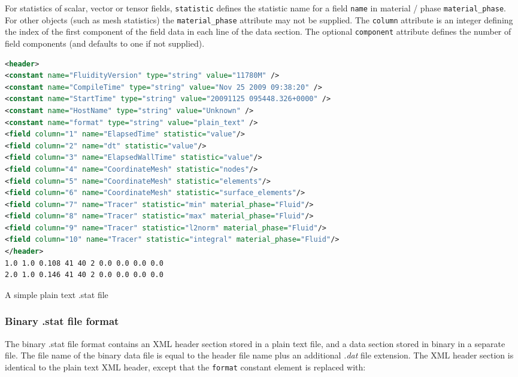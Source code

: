 For statistics of scalar, vector or tensor fields,
\lstinline[language = XML]*statistic* defines the statistic name for
a field \lstinline[language = XML]*name* in material / phase
\lstinline[language = XML]*material_phase*. For other objects (such as mesh
statistics) the \lstinline[language = XML]*material_phase* attribute may not
be supplied. The \lstinline[language = XML]*column* attribute is an integer defining the
index of the first component of the field data in each line of the data section.
The optional \lstinline[language = XML]*component* attribute defines the number
of field components (and defaults to one if not supplied).

\begin{example}
\begin{lstlisting}[language = XML]
<header>
<constant name="FluidityVersion" type="string" value="11780M" />
<constant name="CompileTime" type="string" value="Nov 25 2009 09:38:20" />
<constant name="StartTime" type="string" value="20091125 095448.326+0000" />
<constant name="HostName" type="string" value="Unknown" />
<constant name="format" type="string" value="plain_text" />
<field column="1" name="ElapsedTime" statistic="value"/>
<field column="2" name="dt" statistic="value"/>
<field column="3" name="ElapsedWallTime" statistic="value"/>
<field column="4" name="CoordinateMesh" statistic="nodes"/>
<field column="5" name="CoordinateMesh" statistic="elements"/>
<field column="6" name="CoordinateMesh" statistic="surface_elements"/>
<field column="7" name="Tracer" statistic="min" material_phase="Fluid"/>
<field column="8" name="Tracer" statistic="max" material_phase="Fluid"/>
<field column="9" name="Tracer" statistic="l2norm" material_phase="Fluid"/>
<field column="10" name="Tracer" statistic="integral" material_phase="Fluid"/>
</header>
1.0 1.0 0.108 41 40 2 0.0 0.0 0.0 0.0
2.0 1.0 0.146 41 40 2 0.0 0.0 0.0 0.0
\end{lstlisting}
\caption{A simple plain text .stat file}
\end{example}

\subsubsection{Binary .stat file format}

The binary .stat file format contains an XML header section stored in a plain
text file, and a data section stored in binary in
a separate file. The file name of the binary data file is equal to the
header file name plus an additional \textit{.dat} file extension. The XML
header section is identical to the plain text XML header, except that the
\lstinline[language = XML]*format* constant element is replaced with:

